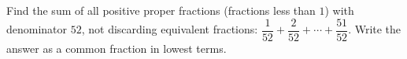 Find the sum of all positive proper fractions (fractions less than $1$) with denominator $52$, not discarding equivalent fractions: $\dfrac{1}{52}+\dfrac{2}{52}+\cdots+\dfrac{51}{52}$. Write the answer as a common fraction in lowest terms.
